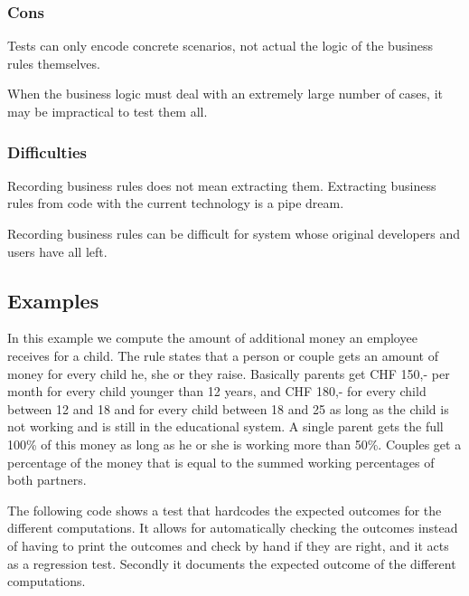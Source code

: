 \documentclass[a4paper,10pt,twoside]{book}
\begin{document}
\subsubsection*{Cons}

\begin{bulletlist}
\item Tests can only encode concrete scenarios, not actual the logic of the business rules themselves.
\item When the business logic must deal with an extremely large number of cases, it may be impractical to test them all.
\end{bulletlist}

\subsubsection*{Difficulties}

\begin{bulletlist}
\item Recording business rules does not mean extracting them. Extracting business rules from code with the current technology is a pipe dream.
\item Recording business rules can be difficult for system whose original developers and users have all left. 
\end{bulletlist}

\subsection*{Examples}

In this example we compute the amount of additional money an employee receives for a child. The rule states that a person or couple gets an amount of money for every child he, she or they raise. Basically parents get CHF 150,- per month for every child younger than 12 years, and CHF 180,- for every child between 12 and 18 and for every child between 18 and 25 as long as the child is not working and is still in the educational system. A single parent gets the full 100\% of this money as long as he or she is working more than 50\%. Couples get a percentage of the money that is equal to the summed working percentages of both partners.

The following  code shows a test that hardcodes the expected outcomes for the different computations. It allows for automatically checking the outcomes instead of having to print the outcomes and check by hand if they are right, and it acts as a regression test. Secondly it documents the expected outcome of the different computations.
\end{document}
